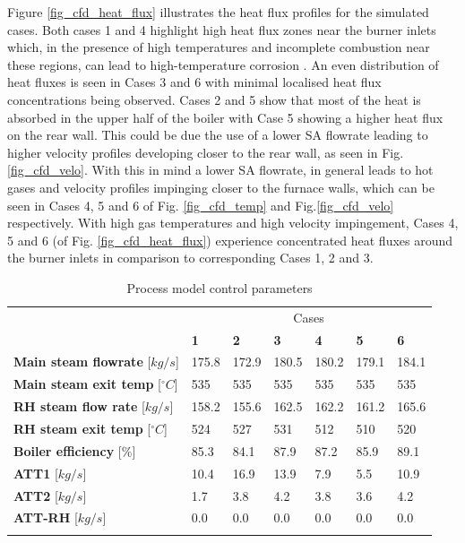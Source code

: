 \documentclass[twocolumn,10pt]{asme2ej}
\begin{document}
\newpage
Figure \ref{fig_cfd_heat_flux} illustrates the heat flux profiles for the simulated cases. Both cases 1 and 4 highlight high heat flux zones near the burner inlets which, in the presence of high temperatures and incomplete combustion near these regions, can lead to high-temperature corrosion \cite{ugum2019}. An even distribution of heat fluxes is seen in Cases 3 and 6 with minimal localised heat flux concentrations being observed. Cases 2 and 5 show that most of the heat is absorbed in the upper half of the boiler with Case 5 showing a higher heat flux on the rear wall. This could be due the use of a lower SA flowrate leading to higher velocity profiles developing closer to the rear wall, as seen in Fig. \ref{fig_cfd_velo}. With this in mind a lower SA flowrate, in general leads to hot gases and velocity profiles impinging closer to the furnace walls, which can be seen in Cases 4, 5 and 6 of Fig. \ref{fig_cfd_temp} and Fig.\ref{fig_cfd_velo} respectively. With high gas temperatures and high velocity impingement, Cases 4, 5 and 6 (of Fig. \ref{fig_cfd_heat_flux}) experience concentrated heat fluxes around the burner inlets in comparison to corresponding Cases 1, 2 and 3.

\begin{table}[h!]
\centering
\caption{Process model control parameters}
\vspace{2mm}
\begin{tabularx}{\linewidth}{p{1in} XXXXXX}
\hline
&\multicolumn{6}{c}{Cases}\\
 & \textbf{1} & \textbf{2} & \textbf{3}& \textbf{4}&\textbf{5}&\textbf{6}\\
\hline
\textbf{Main steam flowrate} 	[$kg/s$]		&175.8&172.9&180.5&180.2&179.1&184.1 \\
\textbf{Main steam exit temp} 	[$^{\circ}C$]	&535& 535 &535&535 &535& 535\\
\textbf{RH steam flow rate} 	[$kg/s$]		&158.2&155.6&162.5&162.2&161.2&165.6\\
\textbf{RH steam exit temp} 	[$^{\circ}C$]	&524&527&531&512&510&520\\
\textbf{Boiler efficiency} 		[$\%$]			&85.3&84.1&87.9	&87.2&85.9&89.1\\
\textbf{ATT1} 		[$kg/s$]					&10.4&16.9&13.9&7.9&5.5&10.9\\
\textbf{ATT2} 		[$kg/s$]					&1.7&3.8&4.2&3.8&3.6&4.2\\
\textbf{ATT-RH} 		[$kg/s$]				&0.0&0.0&0.0&0.0&0.0&0.0\\
\hline
\label{tbl_process_parameters}
\end{tabularx}
\vspace{-10mm}
\end{table}
\end{document}

